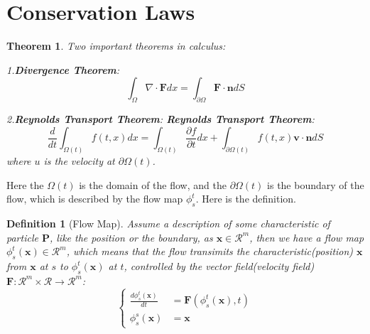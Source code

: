 \documentclass{article}
\newtheorem{theorem}{Theorem}
\newtheorem{definition}{Definition}
\begin{document}
\section{Conservation Laws}
\begin{theorem}Two important theorems in calculus:

    1.\textbf{Divergence Theorem}:
    \begin{equation}
        \int_{\Omega} \nabla \cdot \mathbf{F} d x = \int_{\partial \Omega} \mathbf{F} \cdot \mathbf{n} d S
    \end{equation}

    2.\textbf{Reynolds Transport Theorem}:
    \textbf{Reynolds Transport Theorem}:
    \begin{equation}
        \frac{d}{dt}\int_{\Omega(t)} f(t, x) d x = \int_{\Omega (t)} \frac{\partial f}{\partial t} d x + \int_{\partial \Omega (t)} f(t, x) \mathbf{v} \cdot \mathbf{n} d S
    \end{equation}
    where $u$ is the velocity at $\partial \Omega (t)$.
\end{theorem}
Here the $\Omega(t)$ is the domain of the flow, and the $\partial \Omega(t)$ is the boundary of the flow, which is described by the flow map $\phi_s^t$. Here is the definition.
\begin{definition}[Flow Map]
    Assume a description of some characteristic of particle $\mathbf{P}$, like the position or the boundary, as $\mathbf{x}\in \mathcal{R}^m$, then we have a flow map $\phi_s^t(\mathbf{x})\in \mathcal{R}^m$, 
    which means that the flow transimits the characteristic(position) $\mathbf{x}$ from $\mathbf{x}$ at $s$ to $\phi_s^t(\mathbf{x})$ at $t$, controlled by the vector field(velocity field) $\mathbf{F}: \mathcal{R}^m\times \mathcal{R}\to \mathcal{R}^m$:
    \begin{equation}\left\{
        \begin{aligned}
            \frac{d\phi_s^t(\mathbf{x})}{dt} &= \mathbf{F}(\phi_s^t(\mathbf{x}), t)\\
            \phi_s^s(\mathbf{x}) &= \mathbf{x}
        \end{aligned}\right.
    \end{equation}
\end{definition}
\end{document}
